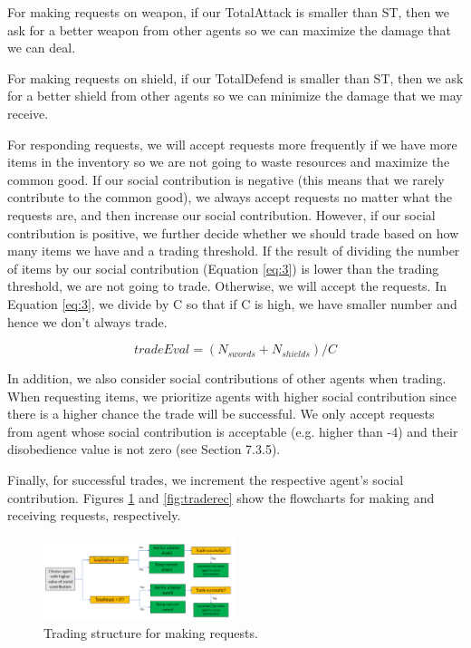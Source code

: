 \par For making requests on weapon, if our TotalAttack is smaller than ST, then we ask for a better weapon from other agents so we can maximize the damage that we can deal.

\par For making requests on shield, if our TotalDefend is smaller than ST, then we ask for a better shield from other agents so we can minimize the damage that we may receive.

\par For responding requests, we will accept requests more frequently if we have more items in the inventory so we are not going to waste resources and maximize the common good. If our social contribution is negative (this means that we rarely contribute to the common good), we always accept requests no matter what the requests are, and then increase our social contribution. However, if our social contribution is positive, we further decide whether we should trade based on how many items we have and a trading threshold. If the result of dividing the number of items by our social contribution (Equation \ref{eq:3}) is lower than the trading threshold, we are not going to trade. Otherwise, we will accept the requests. In Equation \ref{eq:3}, we divide by C so that if C is high, we have smaller number and hence we don't always trade.

\begin{equation}  
tradeEval = (N_{swords} + N_{shields}) / C
\label{eq:3}
\end{equation}

\par In addition, we also consider social contributions of other agents when trading. When requesting items, we prioritize agents with higher social contribution since there is a higher chance the trade will be successful. We only accept requests from agent whose social contribution is acceptable (e.g. higher than -4) and their disobedience value is not zero (see Section 7.3.5).

\par Finally, for successful trades, we increment the respective agent's social contribution. Figures \ref{fig:trademake} and \ref{fig:traderec} show the flowcharts for making and receiving requests, respectively.

\begin{figure}
    \centering
    \includegraphics[width=0.5\textwidth]{007_team_4_agent_design/figures/4_trading_make.png}
    \caption{Trading structure for making requests.}
    \label{fig:trademake}
\end{figure}

